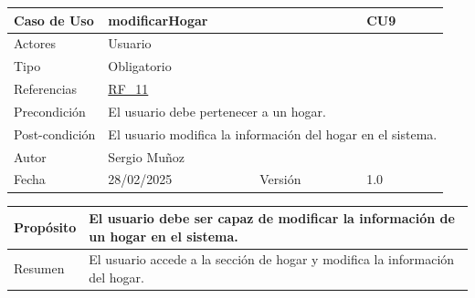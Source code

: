 \newpage

\begin{table}[H]
    \centering
    \begin{tabular}{| m{} | m{} | m{} | m{} |}
        \hline
        \rowcolor[HTML]{C0C0C0} Caso de Uso & \multicolumn{2}{|m{0.43\textwidth}|}{modificarHogar} &  CU9\\ 
        \hline
        Actores & \multicolumn{3}{l|}{Usuario} \\ 
        \hline
        Tipo & \multicolumn{3}{l|}{Obligatorio} \\ 
        \hline
        Referencias & \multicolumn{3}{l|}{\hyperref[req:RF11]{RF\_11}} \\ 
        \hline
        Precondición & \multicolumn{3}{m{0.67\textwidth}|}{El usuario debe pertenecer a un hogar.} \\ 
        \hline
        Post-condición & \multicolumn{3}{m{0.67\textwidth}|}{El usuario modifica la información del hogar en el sistema.} \\ 
        \hline
        Autor & \multicolumn{3}{l|}{Sergio Muñoz} \\ 
        \hline
        Fecha & 28/02/2025 & Versión & 1.0 \\ 
        \hline
    \end{tabular}
\end{table}

\begin{table}[H]
    \centering
    \begin{tabular}{| m{} | m{} | m{} | m{} |}
        \hline
        Propósito & \multicolumn{3}{m{0.67\textwidth}|}{El usuario debe ser capaz de modificar la información de un hogar en el sistema.} \\ 
        \hline
        Resumen & \multicolumn{3}{m{0.67\textwidth}|}{El usuario accede a la sección de hogar y modifica la información del hogar.} \\ 
        \hline
    \end{tabular}
\end{table}

